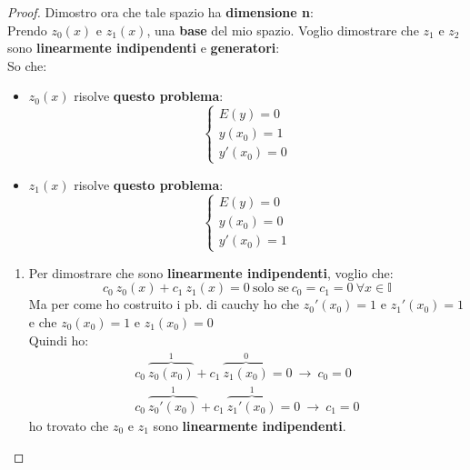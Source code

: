 \documentclass[a4paper, oneside]{article}
\newcommand\I{\mathbb{I}}
\begin{document}
\begin{theorem}
            \begin{proof}
                Dimostro ora che tale spazio ha \textbf{dimensione n}:\\
                Prendo $z_0(x)$ e $z_1(x)$, una \textbf{base} del mio spazio. Voglio dimostrare che $z_1$ e $z_2$ 
                sono \textbf{linearmente indipendenti} e \textbf{generatori}:\\
                So che:
                \begin{itemize}
                    \item $z_0(x)$ risolve \textbf{questo problema}:
                    \[\begin{cases}
                        E(y) = 0\\
                        y(x_0)=1\\
                        y'(x_0)=0
                    \end{cases}\]
                    \item $z_1(x)$ risolve \textbf{questo problema}:
                    \[\begin{cases}
                        E(y) = 0\\
                        y(x_0)=0\\
                        y'(x_0)=1
                    \end{cases}\]
                \end{itemize}
                \begin{enumerate}
                    \item Per dimostrare che sono \textbf{linearmente indipendenti}, voglio che:
                    \[c_0 \ z_0(x) + c_1 \ z_1(x) = 0 \ \text{solo se} \ c_0=c_1=0 \ \forall x\in\I\]
                    Ma per come ho costruito i pb. di cauchy ho che $z_0'(x_0) = 1$ e $z_1'(x_0) = 1$ e che $z_0(x_0) = 1$ e $z_1(x_0) = 0$\\
                    Quindi ho:
                    \begin{gather*}
                        c_0 \ \overbrace{z_0(x_0)}^1 + c_1 \ \overbrace{z_1(x_0)}^0 = 0 \ \to \ c_0 = 0\\
                        c_0 \ \overbrace{z_0'(x_0)}^1 + c_1 \ \overbrace{z_1'(x_0)}^1 = 0 \ \to \ c_1 = 0
                    \end{gather*}
                    ho trovato che $z_0$ e $z_1$ sono \textbf{linearmente indipendenti}.\\


\end{enumerate}
\end{proof}
\end{theorem}
\end{document}
